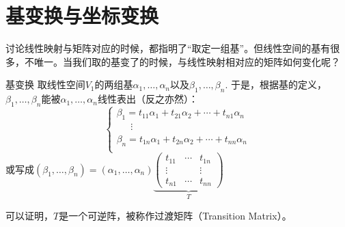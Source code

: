
\section{基变换与坐标变换}


\begin{frame}

{\large
\hspace*{2em}讨论线性映射与矩阵对应的时候，都指明了``取定一组基''。但线性空间的基有很多，不唯一。当我们取的基变了的时候，与线性映射相对应的矩阵如何变化呢？
}

\end{frame}


\begin{frame}

\begin{block}{基变换}
取线性空间$V_1$的两组基$\alpha_1,\ldots,\alpha_n$以及$\beta_1,\ldots,\beta_n$. 于是，根据基的定义，$\beta_1,\ldots,\beta_n$能被$\alpha_1,\ldots,\alpha_n$线性表出（反之亦然）：
\[
\begin{cases}
\beta_1 = t_{11}\alpha_1 + t_{21}\alpha_2 + \cdots + t_{n1}\alpha_n \\
\phantom{yyy} \vdots \\
\beta_n = t_{1n}\alpha_1 + t_{2n}\alpha_2 + \cdots + t_{nn}\alpha_n \\
\end{cases}
\]
或写成\(\displaystyle (\beta_1,\ldots,\beta_n) = (\alpha_1,\ldots,\alpha_n) \underbrace{\begin{pmatrix} t_{11} & \cdots & t_{1n} \\ \vdots & & \vdots \\ t_{n1} & \cdots & t_{nn} \end{pmatrix}}_T\)

可以证明，$T$是一个可逆阵，被称作过渡矩阵（Transition Matrix）。
\end{block}

\end{frame}


